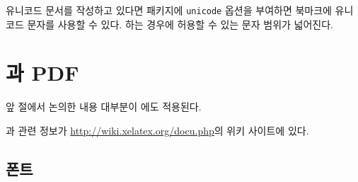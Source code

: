 유니코드 문서를 작성하고 있다면  패키지에 \verb+unicode+ 옵션을 부여하면 북마크에 유니코드 문자를 사용할 수 있다. 하는 경우에 허용할 수 있는 문자 범위가 넓어진다.

\section{과 PDF}
\label{sec:xetex}

%
앞 절에서 논의한 내용 대부분이 \XeLaTeX 에도 적용된다.

\XeTeX 과 \XeLaTeX{} 관련 정보가 \url{http://wiki.xelatex.org/docu.php}의 위키 사이트에 있다.

\subsection{폰트}

